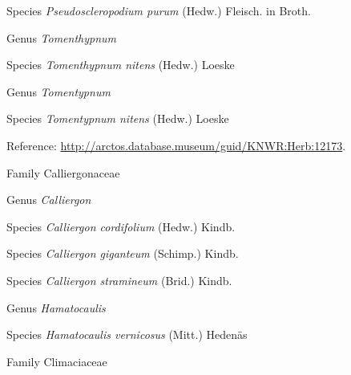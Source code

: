 \documentclass[9pt, article]{memoir}
\begin{document}
\begin{multicols}{2}
\vspace{6pt}\noindent\hspace{36pt}Species \textit{Pseudoscleropodium purum} (Hedw.) Fleisch. in Broth.


\vspace{6pt}\noindent\hspace{30pt}Genus \textit{Tomenthypnum}


\vspace{6pt}\noindent\hspace{36pt}Species \textit{Tomenthypnum nitens} (Hedw.) Loeske


\vspace{6pt}\noindent\hspace{30pt}Genus \textit{Tomentypnum}


\vspace{6pt}\noindent\hspace{36pt}Species \textit{Tomentypnum nitens} (Hedw.) Loeske


\vspace{6pt}Reference: 
\url{http://arctos.database.museum/guid/KNWR:Herb:12173}.

\vspace{6pt}\noindent\hspace{24pt}Family Calliergonaceae


\vspace{6pt}\noindent\hspace{30pt}Genus \textit{Calliergon}


\vspace{6pt}\noindent\hspace{36pt}Species \textit{Calliergon cordifolium} (Hedw.) Kindb.


\vspace{6pt}\noindent\hspace{36pt}Species \textit{Calliergon giganteum} (Schimp.) Kindb.


\vspace{6pt}\noindent\hspace{36pt}Species \textit{Calliergon stramineum} (Brid.) Kindb.


\vspace{6pt}\noindent\hspace{30pt}Genus \textit{Hamatocaulis}


\vspace{6pt}\noindent\hspace{36pt}Species \textit{Hamatocaulis vernicosus} (Mitt.) Hedenäs


\vspace{6pt}\noindent\hspace{24pt}Family Climaciaceae



\end{multicols}
\end{document}
